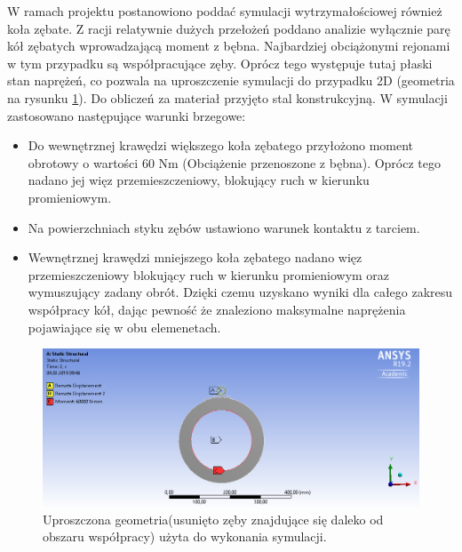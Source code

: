 W ramach projektu postanowiono poddać symulacji wytrzymałościowej również koła zębate.
    Z racji relatywnie dużych przełożeń poddano analizie wyłącznie parę kół zębatych wprowadzającą moment z bębna.
    Najbardziej obciążonymi rejonami w tym przypadku są współpracujące zęby.
    Oprócz tego występuje tutaj płaski stan naprężeń, co pozwala na uproszczenie symulacji do przypadku 2D (geometria na rysunku \ref{fig::geometria_plus_BC_przekladnia}). 
    Do obliczeń za materiał przyjęto stal konstrukcyjną.
    W symulacji zastosowano następujące warunki brzegowe:
    
    \begin{itemize}
    	\item Do wewnętrznej krawędzi większego koła zębatego przyłożono moment obrotowy o wartości 60 Nm (Obciążenie przenoszone z bębna). Oprócz tego nadano jej więz przemieszczeniowy, blokujący ruch w kierunku promieniowym.
    	\item Na powierzchniach styku zębów ustawiono warunek kontaktu z tarciem.
    	\item Wewnętrznej krawędzi mniejszego koła zębatego nadano więz przemieszczeniowy blokujący ruch w kierunku promieniowym oraz wymuszujący zadany obrót. Dzięki czemu uzyskano wyniki dla całego zakresu współpracy kół, dając pewność że znaleziono maksymalne naprężenia pojawiające się w obu elemenetach. 
    \end{itemize}
    

    \begin{figure}[th]
    	\centering
    	\includegraphics[width=0.9\linewidth]{Obliczenia/geometria_plus_BC_przekladnia}
    	\caption{Uproszczona geometria(usunięto zęby znajdujące się daleko od obszaru współpracy) użyta do wykonania symulacji.} 
    	\label{fig::geometria_plus_BC_przekladnia}
    \end{figure}


